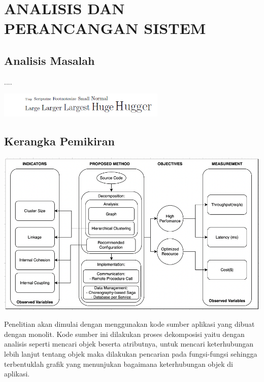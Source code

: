 \chapter{ANALISIS DAN PERANCANGAN SISTEM}
\vspace{4.5pt}

\section{Analisis Masalah}
....

\begin{center}
	\includegraphics[width=8cm]{img/2.PNG}
	\label{fig:asd}
\end{center}

\section{Kerangka Pemikiran}
\begin{center}
	\includegraphics[width=14cm]{img/KerangkaPemikiran.png}
	\label{fig:asd}
\end{center}

Penelitian akan dimulai dengan menggunakan kode sumber aplikasi yang dibuat dengan monolit. Kode sumber ini dilakukan proses dekomposisi yaitu dengan analisis seperti mencari objek beserta atributnya, untuk mencari keterhubungan lebih lanjut tentang objek maka dilakukan pencarian pada fungsi-fungsi sehingga terbentuklah grafik yang menunjukan bagaimana keterhubungan objek di aplikasi. \\

